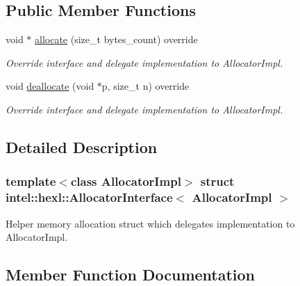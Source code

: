 \subsection*{Public Member Functions}
\begin{DoxyCompactItemize}
\item 
void $\ast$ \hyperlink{structintel_1_1hexl_1_1AllocatorInterface_a02d2d7918ea916fce443ba2f5dbaa8d1}{allocate} (size\+\_\+t bytes\+\_\+count) override
\begin{DoxyCompactList}\small\item\em Override interface and delegate implementation to Allocator\+Impl. \end{DoxyCompactList}\item 
void \hyperlink{structintel_1_1hexl_1_1AllocatorInterface_a2684feec3b8f3cfba626b46912b4cec5}{deallocate} (void $\ast$p, size\+\_\+t n) override
\begin{DoxyCompactList}\small\item\em Override interface and delegate implementation to Allocator\+Impl. \end{DoxyCompactList}\end{DoxyCompactItemize}


\subsection{Detailed Description}
\subsubsection*{template$<$class Allocator\+Impl$>$\newline
struct intel\+::hexl\+::\+Allocator\+Interface$<$ Allocator\+Impl $>$}

Helper memory allocation struct which delegates implementation to Allocator\+Impl. 

\subsection{Member Function Documentation}
\mbox{\label{structintel_1_1hexl_1_1AllocatorInterface_a02d2d7918ea916fce443ba2f5dbaa8d1}} 
